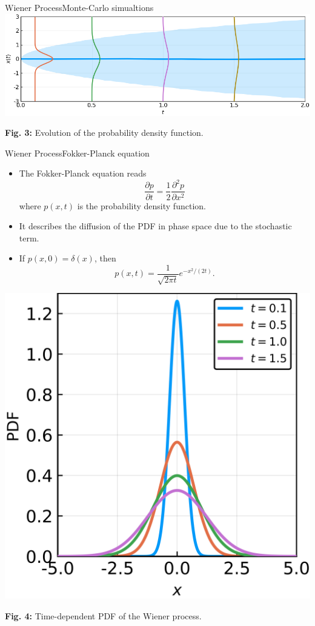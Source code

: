\documentclass[usenames,dvipsnames,svgnames,10pt,aspectratio=169]{beamer}
\begin{document}
\begin{frame}[t, c]{Wiener Process}{Monte-Carlo simualtions}
	\centering
	\includegraphics[width=.8\textwidth]{wiener_process_monte_carlo_summary}

	\textbf{Fig. 3:} Evolution of the probability density function.

	\vspace{1cm}
\end{frame}

\begin{frame}[t, c]{Wiener Process}{Fokker-Planck equation}
	\begin{minipage}{.48\textwidth}
		\begin{itemize}
			\item The Fokker-Planck equation reads
			$$
			\frac{\partial p}{\partial t} = \frac{1}{2} \frac{\partial^2 p}{\partial x^2}
			$$
			where $p(x, t)$ is the probability density function.

			\medskip

			\item It describes the diffusion of the PDF in phase space due to the stochastic term.

			\medskip

			\item If $p(x, 0) = \delta(x)$, then
			$$
			p(x, t) = \frac{1}{\sqrt{2 \pi t}} e^{-x^2 / (2t)}.
			$$
		\end{itemize}
	\end{minipage}%
	\hfill
	\begin{minipage}{.48\textwidth}
		\centering
		\includegraphics[width=.75\columnwidth]{wiener_process_pdf}

		\small{
			\textbf{Fig. 4:} Time-dependent PDF of the Wiener process.
			}
	\end{minipage}

	\vspace{1cm}
\end{frame}
\end{document}
